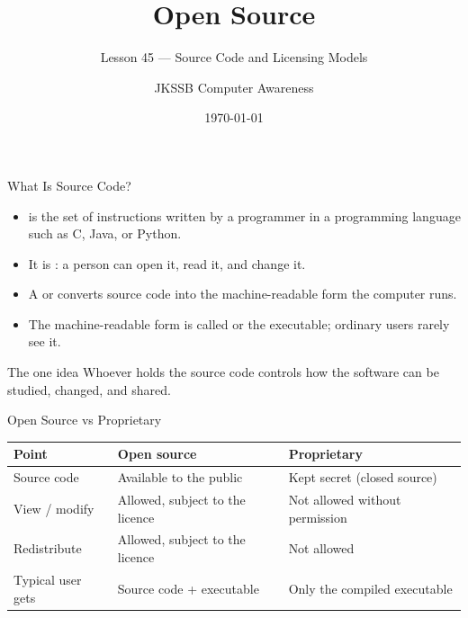 \documentclass[aspectratio=169]{beamer}
\title{Open Source}
\subtitle{Lesson 45 --- Source Code and Licensing Models}
\author{JKSSB Computer Awareness}
\date{\today}
\begin{document}
\frame{\titlepage}

\begin{frame}{What Is Source Code?}
  \begin{itemize}
    \item {} is the set of instructions written by a programmer
      in a programming language such as C, Java, or Python.
    \item It is : a person can open it, read it, and
      change it.
    \item A  or  converts source code into the
      machine-readable form the computer runs.
    \item The machine-readable form is called  or the
      executable; ordinary users rarely see it.
  \end{itemize}
  \begin{block}{The one idea}
    Whoever holds the source code controls how the software can be studied,
    changed, and shared.
  \end{block}
\end{frame}

\begin{frame}{Open Source vs Proprietary}
  \begin{center}
    \begin{tabular}{p{}p{}p{}}
      \toprule
      \textbf{Point} & \textbf{Open source} & \textbf{Proprietary} \\
      \midrule
      Source code & Available to the public & Kept secret (closed source) \\
      View / modify & Allowed, subject to the licence & Not allowed without permission \\
      Redistribute & Allowed, subject to the licence & Not allowed \\
      Typical user gets & Source code + executable & Only the compiled executable \\
      \bottomrule
    \end{tabular}
  \end{center}
  \vspace{0.2cm}
\end{frame}
\end{document}
